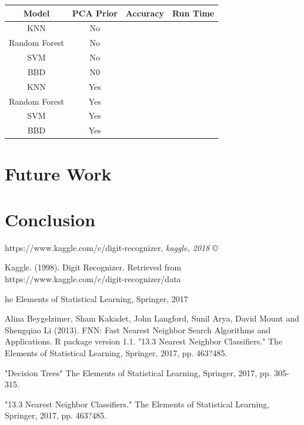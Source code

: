\documentclass[11pt, oneside]{article}   	%
\begin{document}
\begin{center}
\begin{tabular}{ |c|c|c|c| } 
\hline
Model & PCA Prior & Accuracy & Run Time\\
 \hline \hline
  KNN & No &  & \\ 
Random Forest & No &  & \\ 
 SVM & No &  & \\ 
 BBD & N0 &  & \\
 \hline
 KNN & Yes &  & \\ 
Random Forest & Yes &  & \\ 
 SVM & Yes &  & \\ 
 BBD & Yes &  & \\
 \hline
\end{tabular}
\end{center}
\section{Future Work}

\section{Conclusion}


\begin{thebibliography}{9}

https://www.kaggle.com/c/digit-recognizer, \textit{kaggle, 2018} \copyright
 
Kaggle. (1998). Digit Recognizer. Retrieved from https://www.kaggle.com/c/digit-recognizer/data 

he Elements of Statistical Learning, Springer, 2017

Alina Beygelzimer, Sham Kakadet, John Langford, Sunil Arya, David Mount and Shengqiao
  Li (2013). FNN: Fast Nearest Neighbor Search Algorithms and Applications. R package
  version 1.1.
"13.3 Nearest Neighbor Classifiers." The Elements of Statistical Learning, Springer, 2017, pp. 463?485. 

"Decision Trees" The Elements of Statistical Learning, Springer, 2017, pp. 305-315.

"13.3 Nearest Neighbor Classifiers." The Elements of Statistical Learning, Springer, 2017, pp. 463?485.
 
\end{thebibliography}
\end{document}
